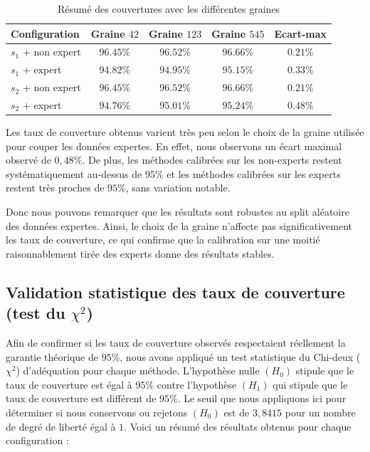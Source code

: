 \documentclass[a4paper,12pt]{article}
\begin{document}
\begin{table}[H]
    \centering
    \begin{tabular}{|l|c|c|c|c|}
        \hline
        \textbf{Configuration} & \textbf{Graine $42$} & \textbf{Graine $123$} & \textbf{Graine $545$} & \textbf{Ecart-max} \\
        \hline
        $s_1$ + non expert & $96.45\%$ & $96.52\%$ & $96.66\%$ & $0.21\%$ \\
        $s_1$ + expert & $94.82\%$ & $94.95\%$ & $95.15\%$ & $0.33\%$ \\
        $s_2$ + non expert & $96.45\%$ & $96.52\%$ & $96.66\%$ & $0.21\%$ \\
        $s_2$ + expert & $94.76\%$ & $95.01\%$ & $95.24\%$ & $0.48\%$ \\
        \hline
    \end{tabular}
    \caption{Résumé des couvertures avec les différentes graines}
    \label{tab:couvertures_graines}
\end{table}

Les taux de couverture obtenus varient très peu selon le choix de la graine utilisée pour couper les données expertes. En effet, nous observons un écart maximal observé de $0,48\%$. De plus, les méthodes calibrées sur les non-experts restent systématiquement au-dessus de $95\%$ et les méthodes calibrées sur les experts restent très proches de $95\%$, sans variation notable.

\vspace{0.2cm}

Donc nous pouvons remarquer que les résultats sont robustes au split aléatoire des données expertes. Ainsi, le choix de la graine n’affecte pas significativement les taux de couverture, ce qui confirme que la calibration sur une moitié raisonnablement tirée des experts donne des résultats stables.

\subsection{Validation statistique des taux de couverture (test du $\chi^2$)}

Afin de confirmer si les taux de couverture observés respectaient réellement la garantie théorique de $95\%$, nous avons appliqué un test statistique du Chi-deux ($\chi^2$) d’adéquation pour chaque méthode. L’hypothèse nulle $(H_0)$ stipule que le taux de couverture est égal à $95\%$ contre l'hypothèse $(H_1)$ qui stipule que le taux de couverture est différent de $95\%$. Le seuil que nous appliquons ici pour déterminer si nous conservons ou rejetons $(H_0)$ est de $3,8415$ pour un nombre de degré de liberté égal à $1$. Voici un résumé des résultats obtenus pour chaque configuration :
\end{document}
